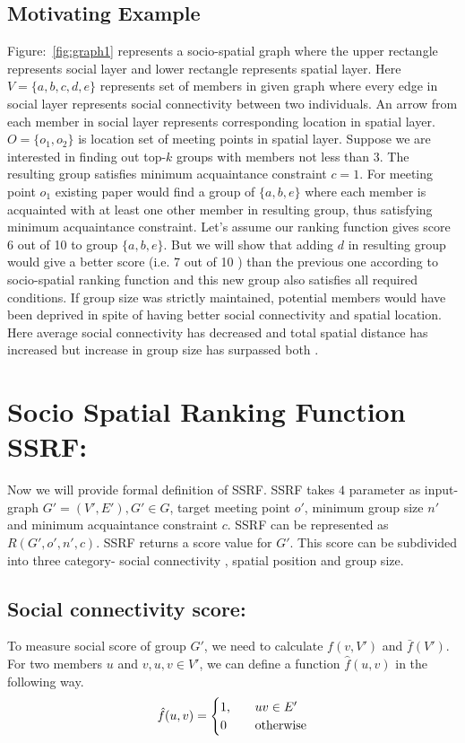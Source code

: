 \documentclass{vldb}
\begin{document}
		
		
		\subsection*{Motivating Example} Figure:~\ref{fig:graph1} represents a socio-spatial graph where the upper rectangle represents social layer and lower rectangle represents spatial layer. Here $ V=\{a,b,c,d,e\} $ represents set of members in given graph where every edge in social layer represents social connectivity between two individuals.  An arrow from each member in social layer represents corresponding location in spatial layer.   $ O=\{o_{1},o_{2}\} $ is location set of meeting points in spatial layer. Suppose we are interested in finding out top-$ k $ groups with members not less than 3. The resulting group satisfies minimum acquaintance constraint $ c=1 $. For meeting point $ o_{1} $ existing paper \cite{yang2012socio} would find a group of $ \{a,b,e\} $ where each member is acquainted with at least one other member in resulting group, thus satisfying minimum acquaintance constraint. Let's assume our ranking function gives score 6 out of 10 to group $ \{a,b,e\} $. But we will show that adding $ d $ in resulting group would give a better score (i.e. 7 out of 10 ) than the previous one according to socio-spatial ranking function and this new group also satisfies all required conditions. If group size was strictly maintained, potential members would have been deprived in spite of having better social connectivity and spatial location. Here average social connectivity has decreased and total spatial distance has increased but increase in group size has surpassed both .
		
		
		
		
		
		
		\section{Socio Spatial Ranking Function SSRF:}
		Now we will provide formal definition of SSRF. SSRF takes $ 4 $ parameter as input- graph $ G'=(V',E'),G' \in G $, target meeting point $ o' $,  minimum group size $ n' $ and minimum acquaintance constraint $ c $. SSRF can be represented as $ R(G',o',n',c) $. 
		SSRF returns a score value for $ G' $. This score can be subdivided into three category- social connectivity , spatial position and group size.   
		\subsection{Social connectivity score: } 
		To measure social score of group $ G' $, we need to calculate  $ f(v,V')$  and  $\bar{f}(V') $. For two members $ u $ and $ v ,u,v \in V'$, we can define a function $ \hat{f}(u,v) $ in the following way.
		\begin{equation*}
		\hat{f}(u,v)=
		\begin{cases}
		\text{1,} & \quad\text{$ uv \in E' $}\\
		\text{0} & \quad\text{otherwise}							
		\end{cases}
		\end{equation*}
		
\end{document}
